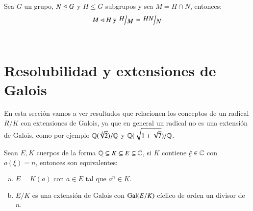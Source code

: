 \begin{obs}
    Sea $G$ un grupo, $N\trianglelefteq G$ y $H \leq G$ subgrupos y sea $M = H \cap N$, entonces:
    $$
        M \normsub H \text{ y } \quo{H}{M} \isom \quo{HN}{N}
    $$
    \begin{center}
        \\
    \end{center}
\end{obs}

\section{Resolubilidad y extensiones de Galois}

En esta sección vamos a ver resultados que relacionen los conceptos de un radical $R/K$ con extensiones de Galois, ya que en general un radical no es una extensión de Galois, como por ejemplo $\mathbb{Q}(\sqrt[4]{2})/\mathbb{Q}$ y
$\mathbb{Q}(\sqrt{1+\sqrt 7})/\mathbb{Q}$.

\begin{thm}[Kummer]\label{thm:5.1}
    Sean $E, K$ cuerpos de la forma $\mathbb{Q} \subseteq K \subseteq E \subseteq \mathbb{C}$, si $K$ contiene $\xi \in \mathbb{C}$ con $o(\xi) = n$, entonces son equivalentes:
    \begin{enumerate}[a)]
        \item $E = K(a)$ con $a \in E$ tal que $a^n \in K$.
        \item $E/K$ es una extensión de Galois con $\mathrm{Gal}(E/K)$ cíclico de orden un divisor de $n$.
    \end{enumerate}
\end{thm}

